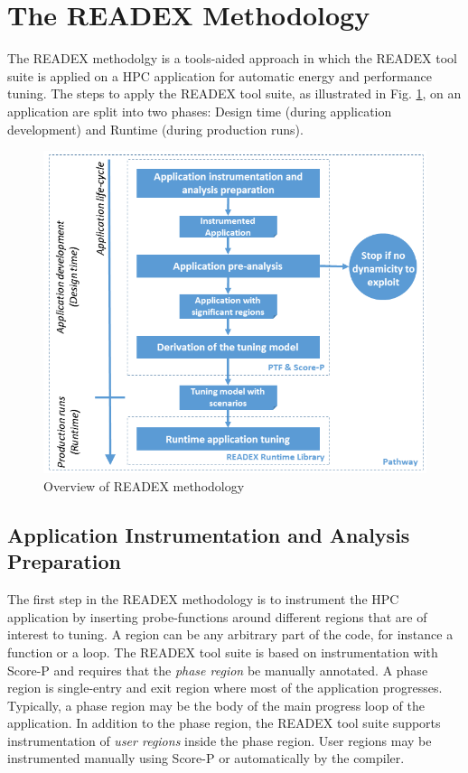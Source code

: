 \section{The READEX Methodology} \label{sec:methodology}

The READEX methodolgy is a tools-aided approach in which the READEX tool suite is applied on a HPC application for automatic energy and performance tuning. The steps to apply the READEX tool suite, as illustrated in Fig. \ref{fig:readex_methodology}, on an application are split into two phases: Design time (during application development) and Runtime (during production runs).

\begin{figure}[!t]
\centering
\includegraphics[width=.70\columnwidth]{figures/READEX_workflow.png}
\caption{Overview of READEX methodology}
\label{fig:readex_methodology}
\end{figure}

\subsection{Application Instrumentation and Analysis Preparation}
\label{sec:application_instrumentation}
The first step in the READEX methodology is to instrument the HPC application by inserting probe-functions around different regions that are of interest to tuning. A region can be any arbitrary part of the code, for instance a function or a loop. The READEX tool suite is based on instrumentation with Score-P and requires that the \textit{phase region} be manually annotated. A phase region is single-entry and exit region where most of the application progresses. Typically, a phase region may be the body of the main progress loop of the application. In addition to the phase region, the READEX tool suite supports instrumentation of \textit{user regions} inside the phase region. User regions may be instrumented manually using Score-P or automatically by the compiler.

